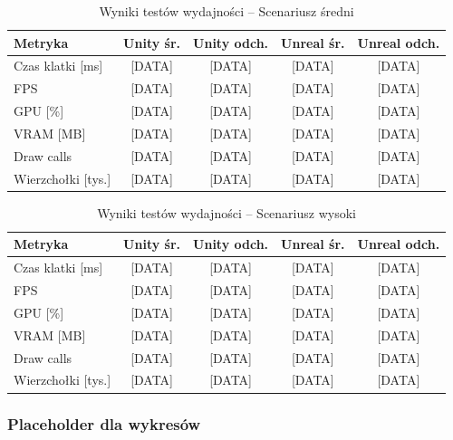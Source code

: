 \begin{table}[h!]
    \centering
    \caption{Wyniki testów wydajności -- Scenariusz średni}
    \label{tab:results-medium}
    \begin{tabular}{|l|c|c|c|c|}
        \hline
        \textbf{Metryka} & \textbf{Unity śr.} & \textbf{Unity odch.} & \textbf{Unreal śr.} & \textbf{Unreal odch.} \\
        \hline\hline
        Czas klatki [ms] & [DATA] & [DATA] & [DATA] & [DATA] \\
        \hline
        FPS & [DATA] & [DATA] & [DATA] & [DATA] \\
        \hline
        GPU [\%] & [DATA] & [DATA] & [DATA] & [DATA] \\
        \hline
        VRAM [MB] & [DATA] & [DATA] & [DATA] & [DATA] \\
        \hline
        Draw calls & [DATA] & [DATA] & [DATA] & [DATA] \\
        \hline
        Wierzchołki [tys.] & [DATA] & [DATA] & [DATA] & [DATA] \\
        \hline
    \end{tabular}
\end{table}

\begin{table}[h!]
    \centering
    \caption{Wyniki testów wydajności -- Scenariusz wysoki}
    \label{tab:results-high}
    \begin{tabular}{|l|c|c|c|c|}
        \hline
        \textbf{Metryka} & \textbf{Unity śr.} & \textbf{Unity odch.} & \textbf{Unreal śr.} & \textbf{Unreal odch.} \\
        \hline\hline
        Czas klatki [ms] & [DATA] & [DATA] & [DATA] & [DATA] \\
        \hline
        FPS & [DATA] & [DATA] & [DATA] & [DATA] \\
        \hline
        GPU [\%] & [DATA] & [DATA] & [DATA] & [DATA] \\
        \hline
        VRAM [MB] & [DATA] & [DATA] & [DATA] & [DATA] \\
        \hline
        Draw calls & [DATA] & [DATA] & [DATA] & [DATA] \\
        \hline
        Wierzchołki [tys.] & [DATA] & [DATA] & [DATA] & [DATA] \\
        \hline
    \end{tabular}
\end{table}

\subsubsection{Placeholder dla wykresów}

